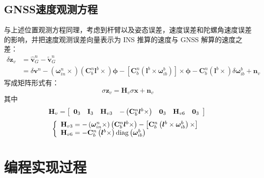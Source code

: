 \documentclass[codepkg=listings,theme=fancy]{course-report}
\begin{document}
\subsection{GNSS速度观测方程}
与上述位置观测方程同理，考虑到杆臂以及姿态误差，速度误差和陀螺角速度误差的影响，并把速度观测误差向量表示为 INS 推算的速度与 GNSS 解算的速度之差：
\begin{equation}
\begin{aligned}
\delta \boldsymbol{z}_{v} & =\hat{\boldsymbol{v}}_{G}^{n}-\tilde{\boldsymbol{v}}_{G}^{n} \\
& =\delta \boldsymbol{v}^{n}-\left(\boldsymbol{\omega}_{i n}^{n} \times\right)\left(\mathbf{C}_{b}^{n} \boldsymbol{l}^{b} \times\right) \boldsymbol{\phi}-\left[\mathbf{C}_{b}^{n}\left(\boldsymbol{l}^{b} \times \boldsymbol{\omega}_{i b}^{b}\right)\right] \times \boldsymbol{\phi}-\mathbf{C}_{b}^{n}\left(\boldsymbol{l}^{b} \times\right) \delta \boldsymbol{\omega}_{i b}^{b}+\boldsymbol{n}_{v}
\end{aligned}
\end{equation}
写成矩阵形式有：
\begin{equation}
\sigma \bm{z}_v=\bm{H}_v\sigma\bm{x}+\bm{n}_v
\end{equation}
其中
\begin{equation}
\mathbf{H}_{v}=\left[\begin{array}{lllllll}
\mathbf{0}_{3} & \mathbf{I}_{3} & \mathbf{H}_{v 3} & -\left(\mathbf{C}_{b}^{n} \boldsymbol{l}^{b} \times\right) & \mathbf{0}_{3} & \mathbf{H}_{v 6} & \mathbf{0}_{3}
\end{array}\right] \\
\end{equation}
\begin{equation}
\left\{\begin{array}{l}
\mathbf{H}_{v 3}=-\left(\boldsymbol{\omega}_{i n}^{n} \times\right)\left(\mathbf{C}_{b}^{n} \boldsymbol{l}^{b} \times\right)-\left[\mathbf{C}_{b}^{n}\left(\boldsymbol{l}^{b} \times \boldsymbol{\omega}_{i b}^{b}\right) \times\right] \\
\mathbf{H}_{v 6}=-\mathbf{C}_{b}^{n}\left(\boldsymbol{l}^{b} \times\right) \operatorname{diag}\left(\boldsymbol{\omega}_{i b}^{b}\right)
\end{array}\right. \\
\end{equation}

\section{编程实现过程}
\end{document}

